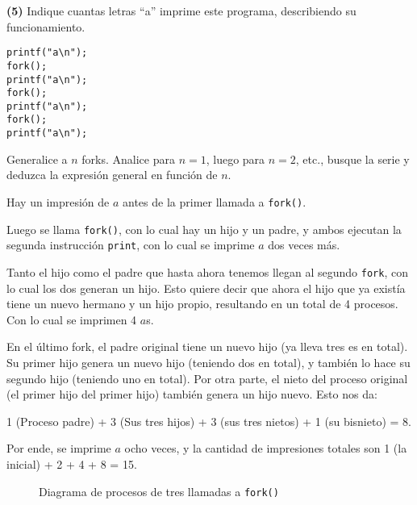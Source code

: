 \documentclass[12pt]{article}
\theoremstyle{definition}
\begin{document}
\pagebreak 

\begin{shaded}
    
\textbf{(5)} Indique cuantas letras “a” imprime este programa, describiendo su
funcionamiento.

\begin{verbatim}
printf("a\n");
fork();
printf("a\n");
fork();
printf("a\n");
fork();
printf("a\n");
\end{verbatim}

Generalice a $n$ forks. Analice para $n=1$, luego para $n=2$, etc., busque la
serie y deduzca la expresión
general en función de $n$.
\end{shaded}

Hay un impresión de $a$ antes de la primer llamada a \texttt{fork()}. 

Luego se llama \texttt{fork()}, con lo cual hay un hijo y un padre, y ambos
ejecutan la segunda instrucción \texttt{print}, con lo cual se imprime $a$ dos
veces más.

Tanto el hijo como el padre que hasta ahora tenemos llegan al segundo
\texttt{fork}, con lo cual los dos generan un hijo. Esto quiere decir que ahora 
el hijo que ya existía tiene un nuevo hermano y un hijo propio, resultando en un
total de 4 procesos. Con lo cual se imprimen 4 $a$s. 

En el último fork, el padre original tiene un nuevo hijo (ya lleva tres es en
total). Su primer hijo genera un nuevo hijo (teniendo dos en total), y también
lo hace su segundo hijo (teniendo uno en total). Por otra parte, el nieto del
proceso original (el primer hijo del primer hijo) también genera un hijo nuevo.
Esto nos da:

1 (Proceso padre) + 3 (Sus tres hijos) + 3 (sus tres nietos) + 1 (su bisnieto) =
8. 

Por ende, se imprime $a$ ocho veces, y la cantidad de impresiones totales son 1
(la inicial) + 2 + 4 + 8 = 15.

\begin{figure}[ht]
  \centering
{}
  \caption{Diagrama de procesos de tres llamadas a \texttt{fork()}}
\end{figure}
\end{document}
